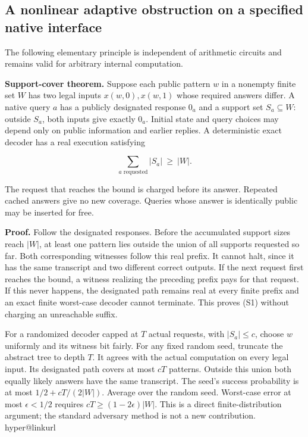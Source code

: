 \documentclass[11pt,a4paper]{article}
\makeatletter
\newcommand{\PaperSixCatalogue}[1]{\csname hyper@linkurl\endcsname{#1}{EVIDENCE_CATALOG.md}}
\newcommand{\PaperSixEvidence}[2]{\PaperSixCatalogue{#2}}
\makeatother
\begin{document}
\subsection{A nonlinear adaptive obstruction on a specified native
interface}\label{v9-a-nonlinear-adaptive-obstruction-on-a-specified-native-interface}

The following elementary principle is independent of arithmetic circuits
and remains valid for arbitrary internal computation.

\textbf{Support-cover theorem.} Suppose each public pattern \(w\) in a
nonempty finite set \(W\) has two legal inputs \(x(w,0),x(w,1)\) whose
required answers differ. A native query \(a\) has a publicly designated
response \(0_a\) and a support set \(S_a\subseteq W\): outside \(S_a\),
both inputs give exactly \(0_a\). Initial state and query choices may
depend only on public information and earlier replies. A deterministic
exact decoder has a real execution satisfying

\[
                  \sum_{a\text{ requested}}|S_a|\ \ge\ |W|.       \tag{S1}
\]

The request that reaches the bound is charged before its answer.
Repeated cached answers give no new coverage. Queries whose answer is
identically public may be inserted for free.

\textbf{Proof.} Follow the designated responses. Before the accumulated
support sizes reach \(|W|\), at least one pattern lies outside the union
of all supports requested so far. Both corresponding witnesses follow
this real prefix. It cannot halt, since it has the same transcript and
two different correct outputs. If the next request first reaches the
bound, a witness realizing the preceding prefix pays for that request.
If this never happens, the designated path remains real at every finite
prefix and an exact finite worst-case decoder cannot terminate. This
proves (S1) without charging an unreachable suffix.

For a randomized decoder capped at \(T\) actual requests, with
\(|S_a|\le c\), choose \(w\) uniformly and its witness bit fairly. For
any fixed random seed, truncate the abstract tree to depth \(T\). It
agrees with the actual computation on every legal input. Its designated
path covers at most \(cT\) patterns. Outside this union both equally
likely answers have the same transcript. The seed's success probability
is at most \(1/2+cT/(2|W|)\). Average over the random seed. Worst-case
error at most \(\epsilon<1/2\) requires \(cT\ge(1-2\epsilon)|W|\). This
is a direct finite-distribution argument; the standard adversary method
is not a new contribution.
\PaperSixEvidence{evidence/research_v9/formal/DiagonalQueryTree.lean}{Actual-tree Lean proof}
\end{document}
